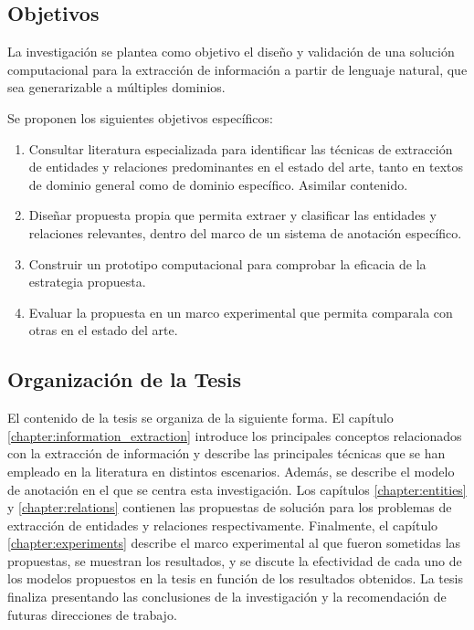 \subsection*{Objetivos}

La investigación se plantea como objetivo el diseño y validación de una solución computacional para la extracción de información a partir de lenguaje natural, que sea generarizable a múltiples dominios.

Se proponen los siguientes objetivos específicos:

\begin{enumerate}
	\item Consultar literatura especializada para identificar las técnicas de extracción de entidades y relaciones predominantes en el estado del arte, tanto en textos de dominio general como de dominio específico. Asimilar contenido.
	
	\item Diseñar propuesta propia que permita extraer y clasificar las entidades y relaciones relevantes, dentro del marco de un sistema de anotación específico.
	
	\item Construir un prototipo computacional para comprobar la eficacia de la estrategia propuesta.
	
	\item Evaluar la propuesta en un marco experimental que permita comparala con otras en el estado del arte.
	
\end{enumerate}

\subsection*{Organización de la Tesis}

El contenido de la tesis se organiza de la siguiente forma.
El capítulo \ref{chapter:information_extraction} introduce los principales conceptos relacionados con la extracción de información y describe las principales técnicas que se han empleado en la literatura en distintos escenarios.
Además, se describe el modelo de anotación en el que se centra esta investigación.
Los capítulos \ref{chapter:entities} y \ref{chapter:relations} contienen las propuestas de solución para los problemas de extracción de entidades y relaciones respectivamente.
Finalmente, el capítulo \ref{chapter:experiments} describe el marco experimental al que fueron sometidas las propuestas, se muestran los resultados, y se discute la efectividad de cada uno de los modelos propuestos en la tesis en función de los resultados obtenidos.
La tesis finaliza presentando las conclusiones de la investigación y la recomendación de futuras direcciones de trabajo.

